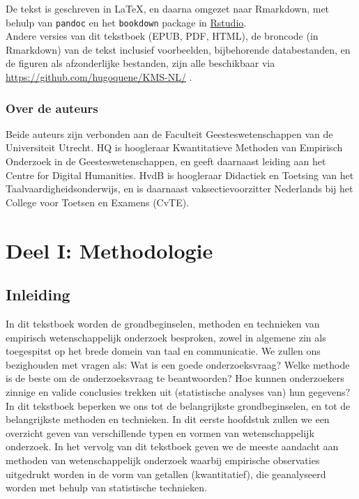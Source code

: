 \documentclass[
]{book}
\begin{document}
De tekst is geschreven in LaTeX, en daarna omgezet naar Rmarkdown, met behulp van \texttt{pandoc} \citep{pandoc} en het \texttt{bookdown} package \citep{R-bookdown} in \href{https://www.rstudio.com}{Rstudio}.\\
Andere versies van dit tekstboek (EPUB, PDF, HTML), de broncode (in Rmarkdown) van de tekst inclusief voorbeelden, bijbehorende databestanden, en de figuren als afzonderlijke bestanden, zijn alle beschikbaar via \url{https://github.com/hugoquene/KMS-NL/} .

\hypertarget{over-de-auteurs}{%
\section*{Over de auteurs}\label{over-de-auteurs}}

Beide auteurs zijn verbonden aan de Faculteit Geesteswetenschappen van de Universiteit Utrecht. HQ is hoogleraar Kwantitatieve Methoden van Empirisch Onderzoek in de Geesteswetenschappen, en geeft daarnaast leiding aan het Centre for Digital Humanities. HvdB is hoogleraar Didactiek en Toetsing van het Taalvaardigheidsonderwijs, en is daarnaast vaksectievoorzitter Nederlands bij het College voor Toetsen en Examens (CvTE).

\hypertarget{part-deel-i-methodologie}{%
\part*{Deel I: Methodologie}\label{part-deel-i-methodologie}}

\hypertarget{ch:inleiding}{%
\chapter{Inleiding}\label{ch:inleiding}}

In dit tekstboek worden de grondbeginselen, methoden en technieken van
empirisch wetenschappelijk onderzoek besproken, zowel in algemene zin
als toegespitst op het brede domein van taal en communicatie. We zullen ons bezighouden met vragen als: Wat is een goede onderzoeksvraag? Welke methode is de beste om de onderzoeksvraag te beantwoorden? Hoe kunnen onderzoekers zinnige en valide conclusies trekken uit (statistische analyses van) hun gegevens? In dit tekstboek beperken we ons tot de belangrijkste grondbeginselen, en tot de belangrijkste methoden en technieken. In dit eerste hoofdstuk zullen we een overzicht geven van verschillende typen en vormen van wetenschappelijk onderzoek. In het vervolg van dit tekstboek geven we de meeste aandacht aan methoden van wetenschappelijk onderzoek waarbij empirische observaties uitgedrukt worden in de vorm van getallen (kwantitatief), die geanalyseerd worden met behulp van statistische technieken.
\end{document}
